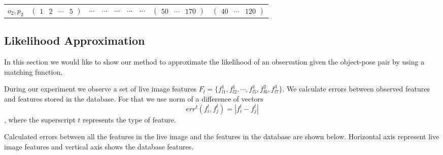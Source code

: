 \documentclass[11pt]{article}
\begin{document}
\begin{table}[h]
\begin{tabular}{c|c c c c c c c c}
				$o_2,p_2$ 	& $\begin{pmatrix} 1 & 2 & \cdots & 5\end{pmatrix} $	& $\cdots$ 	& $\cdots$	& $\cdots$	& $\cdots$ 	& $\cdots$ & $\begin{pmatrix} 50 & \cdots & 170\end{pmatrix} $ 	& $\begin{pmatrix} 40 & \cdots & 120\end{pmatrix} $ 	
			\end{tabular}
			\label{tab:database}
		\end{table}	
		
	\subsection{Likelihood Approximation}

	In this section we would like to show our method to approximate the likelihood of an observation given the object-pose pair by using a matching function. 

	During our experiment we observe a set of live image features $F_l = \{f_{l1}^1, f_{l2}^1, \cdots, f_{l5}^1, f_{l6}^2, f_{l7}^3  \}$. We calculate errors between observed features and features stored in the database. For that we use norm of a difference of vectors
	\[err^t(f_i^t, f_j^t) = |f_i^t - f_j^t|\], where the superscript $t$ represents the type of feature.

	Calculated errors between all the features in the live image and the features in the database are shown below. Horizontal axis represent live image features and vertical axis shows the database features.
	\newpage
\end{document}
